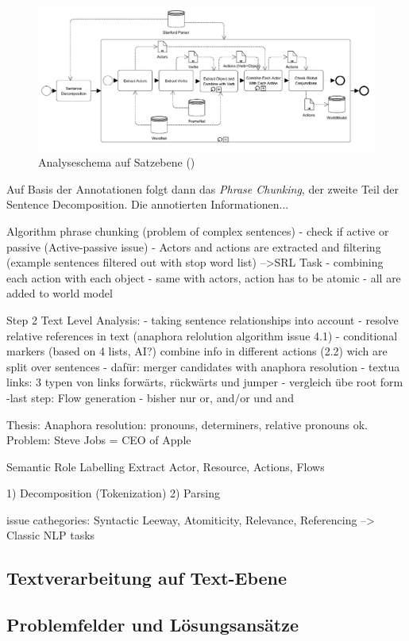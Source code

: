 \begin{figure}
\includegraphics[width=13cm]{pictures/SentenceLevel.png}
\caption{Analyseschema auf Satzebene (\cite[vgl.][5]{FRIEDRICH2})}
\label{fig:SLEVEL}
\end{figure}

Auf Basis der Annotationen folgt dann das \textit{Phrase Chunking}, der zweite Teil der Sentence Decomposition. Die annotierten Informationen...




Algorithm phrase chunking (problem of complex sentences)
- check if active or passive (Active-passive issue)
- Actors and actions are extracted and filtering (example sentences filtered out with stop word list)
-->SRL Task
- combining each action with each object
- same with actors, action has to be atomic
- all are added to world model

Step 2 Text Level Analysis:
- taking sentence relationships into account
- resolve relative references in text (anaphora relolution algorithm issue 4.1)
- conditional markers (based on 4 lists, AI?)
combine info in different actions (2.2) wich are split over sentences
- dafür: merger candidates with anaphora resolution
- textua links: 3 typen von links forwärts, rückwärts und jumper
- vergleich übe root form
-last step: Flow generation
- bisher nur or, and/or und and


Thesis:
Anaphora resolution:
pronouns, determiners, relative pronouns ok. Problem: Steve Jobs = CEO of Apple

Semantic Role Labelling
Extract Actor, Resource, Actions, Flows

1) Decomposition (Tokenization)
2) Parsing

issue cathegories: Syntactic Leeway, Atomiticity, Relevance, Referencing
--> Classic NLP tasks

\subsection{Textverarbeitung auf Text-Ebene}
\subsection{Problemfelder und Lösungsansätze}



